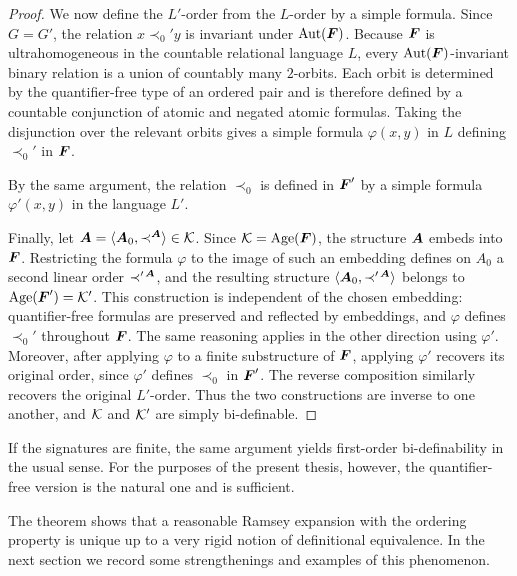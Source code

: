 \begin{proof}
    We now define the \(L'\)-order from the \(L\)-order by a simple formula. Since \(G=G'\), the relation
    \(x\prec_0' y\)
    is invariant under \(\operatorname{Aut}(\boldsymbol{F})\). Because \(\boldsymbol{F}\) is ultrahomogeneous in the
    countable relational language \(L\), every \(\operatorname{Aut}(\boldsymbol{F})\)-invariant binary
    relation is a union of countably many \(2\)-orbits. Each orbit is determined
    by the quantifier-free type of an ordered pair and is therefore defined by
    a countable conjunction of atomic and negated atomic formulas. Taking the
    disjunction over the relevant orbits gives a simple formula
    \(\varphi(x,y)\) in \(L\) defining \(\prec_0'\) in \(\boldsymbol{F}\).

    By the same argument, the relation \(\prec_0\) is defined in \(\boldsymbol{F}'\) by a simple
    formula \(\varphi'(x,y)\) in the language \(L'\).

    Finally, let \(\boldsymbol{A}=\langle \boldsymbol{A}_0,\prec^{\boldsymbol{A}}\rangle\in\mathcal{K}\).
    Since \(\mathcal{K}=\operatorname{Age}(\boldsymbol{F})\), the structure \(\boldsymbol{A}\) embeds into \(\boldsymbol{F}\). Restricting the formula \(\varphi\) to the image of such an embedding defines on \(A_0\) a second linear order \(\prec'^{\,\boldsymbol{A}}\), and the resulting structure
    \(\langle \boldsymbol{A}_0,\prec'^{\,\boldsymbol{A}}\rangle\)
    belongs to \(\operatorname{Age}(\boldsymbol{F}')=\mathcal{K}'\). This construction is independent of the
    chosen embedding: quantifier-free formulas are preserved and reflected by
    embeddings, and \(\varphi\) defines \(\prec_0'\) throughout \(\boldsymbol{F}\).
    The same reasoning applies in the other direction using \(\varphi'\).
    Moreover, after applying \(\varphi\) to a finite substructure of \(\boldsymbol{F}\),
    applying \(\varphi'\) recovers its original order, since \(\varphi'\)
    defines \(\prec_0\) in \(\boldsymbol{F}'\). The reverse composition similarly
    recovers the original \(L'\)-order. Thus the two constructions are inverse
    to one another, and \(\mathcal{K}\) and \(\mathcal{K}'\) are simply bi-definable.
\end{proof}

\begin{remark}
    If the signatures are finite, the same argument yields first-order bi-definability in the usual sense. For the purposes of the present thesis, however, the quantifier-free version is the natural one and is sufficient.
\end{remark}

The theorem shows that a reasonable Ramsey expansion with the ordering property is unique up to a very rigid notion of definitional equivalence. In the next section we record some strengthenings and examples of this phenomenon.

